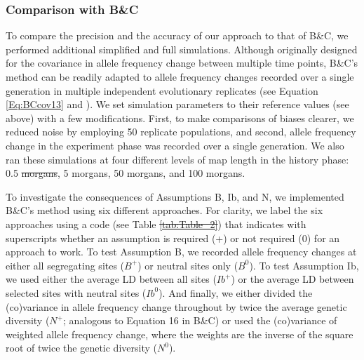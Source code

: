 \documentclass[12pt]{article}
\makeatletter
\providecommand{\DIFaddtex}[1]{{\protect\color{blue}\uwave{#1}}} %
\providecommand{\DIFdeltex}[1]{{\protect\color{red}\sout{#1}}} %
\providecommand{\DIFaddbegin}{} %
\providecommand{\DIFaddend}{} %
\providecommand{\DIFdelbegin}{} %
\providecommand{\DIFdelend}{} %
\providecommand{\DIFadd}[1]{\texorpdfstring{\DIFaddtex{#1}}{#1}} %
\providecommand{\DIFdel}[1]{\texorpdfstring{\DIFdeltex{#1}}{}} %
\newcommand{\DIFscaledelfig}{0.5}
\newlength{\DIFdelgraphicswidth} %
\newlength{\DIFdelgraphicsheight} %
\newcommand{\DIFaddincludegraphics}[2][]{{\color{blue}\fbox{\DIFOincludegraphics[#1]{#2}}}} %
\newcommand{\DIFdelincludegraphics}[2][]{%
\sbox{\DIFdelgraphicsbox}{\DIFOincludegraphics[#1]{#2}}%
\settoboxwidth{\DIFdelgraphicswidth}{\DIFdelgraphicsbox} %
\settoboxtotalheight{\DIFdelgraphicsheight}{\DIFdelgraphicsbox} %
\scalebox{\DIFscaledelfig}{%
\parbox[b]{\DIFdelgraphicswidth}{\usebox{\DIFdelgraphicsbox}\\[-\baselineskip] \rule{\DIFdelgraphicswidth}{0em}}\llap{\resizebox{\DIFdelgraphicswidth}{\DIFdelgraphicsheight}{%
\setlength{\unitlength}{\DIFdelgraphicswidth}%
\begin{picture}(1,1)%
\thicklines\linethickness{2pt} %
{\color[rgb]{1,0,0}\put(0,0){\framebox(1,1){}}}%
{\color[rgb]{1,0,0}\put(0,0){\line( 1,1){1}}}%
{\color[rgb]{1,0,0}\put(0,1){\line(1,-1){1}}}%
\end{picture}%
}\hspace*{3pt}}} %
} %
\DeclareRobustCommand{\DIFaddbegin}{\DIFOaddbegin \let\includegraphics\DIFaddincludegraphics} %
\DeclareRobustCommand{\DIFaddend}{\DIFOaddend \let\includegraphics\DIFOincludegraphics} %
\DeclareRobustCommand{\DIFdelbegin}{\DIFOdelbegin \let\includegraphics\DIFdelincludegraphics} %
\DeclareRobustCommand{\DIFdelend}{\DIFOaddend \let\includegraphics\DIFOincludegraphics} %
\let\sout@orig\sout %
\renewcommand{\sout}[1]{\ifmmode\text{\sout@orig{\ensuremath{#1}}}\else\sout@orig{#1}\fi} %
\makeatother
\begin{document}
\begin{bibunit}
\subsubsection*{Comparison with B\&C}

To compare the precision and the accuracy of our approach to that of B\&C, we performed additional simplified and full simulations. Although originally designed for the covariance in allele frequency change between multiple time points, B\&C's method can be readily adapted to allele frequency changes recorded over a single generation in multiple independent evolutionary replicates (see Equation \ref{Eq:BCcov13} and \citet{Buffalo.2020}). We set simulation parameters to their reference values (see above) with a few modifications. First, to make comparisons of biases clearer, we reduced noise by employing 50 replicate populations, and second, allele frequency change in the experiment phase was recorded over a single generation. We also ran these simulations at four different levels of map length in the history phase: 0.5 \DIFdelbegin \DIFdel{morgans}\DIFdelend \DIFaddbegin \DIFadd{morgan}\DIFaddend , 5 morgans, 50 morgans, and 100 morgans.

To investigate the consequences of Assumptions B, Ib, and N, we implemented B\&C's method using six different approaches. For clarity, we label the six approaches using a code (see Table \DIFdelbegin \DIFdel{\ref{tab:Table_2}}\DIFdelend \DIFaddbegin \DIFadd{\ref{tab:BC_approaches}}\DIFaddend ) that indicates with superscripts whether an assumption is required (+) or not required (0) for an approach to work. To test Assumption B, we recorded allele frequency changes at either all segregating sites ($B^+$) or neutral sites only ($B^0$). To test Assumption Ib, we used either the average LD between all sites ($Ib^+$) or the average LD between selected sites with neutral sites ($Ib^0$). And finally, we either divided the (co)variance in allele frequency change throughout by twice the average genetic diversity ($N^+$; analogous to Equation 16 in B\&C) or used the (co)variance of weighted allele frequency change, where the weights are the inverse of the square root of twice the genetic diversity ($N^0$).  


\end{bibunit}
\end{document}
